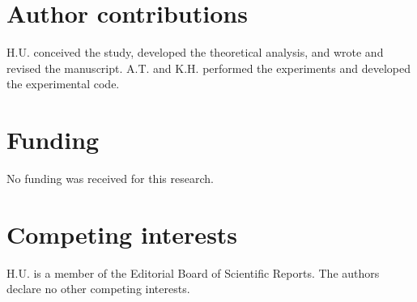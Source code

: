 \documentclass[pdflatex,sn-mathphys-num]{sn-jnl}
\begin{document}
\section*{Author contributions}
H.U. conceived the study, developed the theoretical analysis, and wrote and revised the manuscript. A.T. and K.H. performed the experiments and developed the experimental code.

\section*{Funding}
No funding was received for this research.

\section*{Competing interests}
H.U. is a member of the Editorial Board of Scientific Reports. The authors declare no other competing interests.
\end{document}
